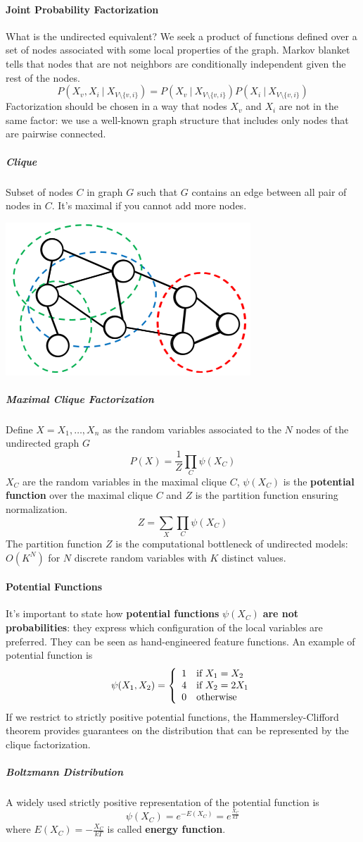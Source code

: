 \documentclass[10pt]{report}
\begin{document}
\paragraph{Joint Probability Factorization} What is the undirected equivalent? We seek a product of functions defined over a set of nodes associated with some local properties of the graph. Markov blanket tells that nodes that are not neighbors are conditionally independent given the rest of the nodes.$$P(X_v,X_i\:|\:X_{V\setminus\{v,i\}}) = P(X_v\:|\:X_{V\setminus\{v,i\}})P(X_i\:|\:X_{V\setminus\{v,i\}})$$
Factorization should be chosen in a way that nodes $X_v$ and $X_i$ are not in the same factor: we use a well-known graph structure that includes only nodes that are pairwise connected.
\subparagraph{Clique} Subset of nodes $C$ in graph $G$ such that $G$ contains an edge between all pair of nodes in $C$. It's maximal if you cannot add more nodes.
\begin{center}
	\includegraphics[scale=0.5]{210.png}
\end{center}
\subparagraph{Maximal Clique Factorization} Define $X = X_1,\ldots,X_n$ as the random variables associated to the $N$ nodes of the undirected graph $G$ $$P(X)=\frac{1}{Z}\prod_C \psi(X_C)$$
$X_C$ are the random variables in the maximal clique $C$, $\psi(X_C)$ is the \textbf{potential function} over the maximal clique $C$ and $Z$ is the partition function ensuring normalization.
$$Z = \sum_X\prod_C\psi(X_C)$$
The partition function $Z$ is the computational bottleneck of undirected models: $O(K^N)$ for $N$ discrete random variables with $K$ distinct values.
\paragraph{Potential Functions} It's important to state how \textbf{potential functions} $\psi(X_C)$ \textbf{are not probabilities}: they express which configuration of the local variables are preferred. They can be seen as hand-engineered feature functions. An example of potential function is $$\psi(X_1,X_2)=\left\{ \begin{array}{l l}
1&\text{if }X_1 = X_2\\
4&\text{if }X_2 = 2X_1\\
0&\text{otherwise}
\end{array}\right.$$
If we restrict to strictly positive potential functions, the Hammersley-Clifford theorem provides guarantees on the distribution that can be represented by the clique factorization.
\subparagraph{Boltzmann Distribution} A widely used strictly positive representation of the potential function is $$\psi(X_C)=e^{-E(X_C)} = e^{\frac{X_C}{kT}}$$
where $E(X_C)=-\frac{\displaystyle X_C}{\displaystyle kT}$ is called \textbf{energy function}.
\end{document}
